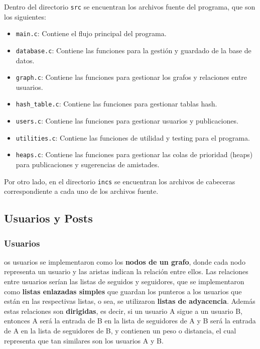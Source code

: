 \documentclass[9pt,letterpaper,onecolumn]{rho-class/rho}
\begin{document}
\vspace{0.5cm}

Dentro del directorio \texttt{src} se encuentran los archivos fuente del programa, que son los siguientes:
\begin{itemize}
	\item \texttt{main.c}: Contiene el flujo principal del programa.
	\item \texttt{database.c}: Contiene las funciones para la gestión y guardado de la base de datos.
	\item \texttt{graph.c}: Contiene las funciones para gestionar los grafos y relaciones entre usuarios.
	\item \texttt{hash\_table.c}: Contiene las funciones para gestionar tablas hash.
	\item \texttt{users.c}: Contiene las funciones para gestionar usuarios y publicaciones.
	\item \texttt{utilities.c}: Contiene las funciones de utilidad y testing para el programa.
	\item \texttt{heaps.c}: Contiene las funciones para gestionar las colas de prioridad (heaps) para publicaciones y sugerencias de amistades.
\end{itemize}

Por otro lado, en el directorio \texttt{incs} se encuentran los archivos de cabeceras correspondiente a cada uno de los archivos fuente.


\subsection{Usuarios y Posts}
\subsubsection{Usuarios}
os usuarios se implementaron como los \textbf{nodos de un grafo}, donde cada nodo representa un usuario y las aristas indican la relación entre ellos. Las relaciones entre usuarios serían las listas de seguidos y seguidores, que se implementaron como \textbf{listas enlazadas simples} que guardan los punteros a los usuarios que están en las respectivas listas, o sea, se utilizaron \textbf{listas de adyacencia}. Además estas relaciones son \textbf{dirigidas}, es decir, si un usuario A sigue a un usuario B, entonces A será la entrada de B en la lista de seguidores de A y B será la entrada de A en la lista de seguidores de B, y contienen un peso o distancia, el cual representa que tan similares son los usuarios A y B.
\end{document}
